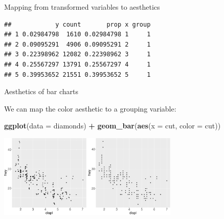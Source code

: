 \documentclass[ignorenonframetext,]{beamer}
\newenvironment{Shaded}{\begin{snugshade}}{\end{snugshade}}
\newcommand{\DataTypeTok}[1]{\textcolor[rgb]{0.13,0.29,0.53}{#1}}
\newcommand{\DecValTok}[1]{\textcolor[rgb]{0.00,0.00,0.81}{#1}}
\newcommand{\KeywordTok}[1]{\textcolor[rgb]{0.13,0.29,0.53}{\textbf{#1}}}
\newcommand{\NormalTok}[1]{#1}
\newcommand{\OperatorTok}[1]{\textcolor[rgb]{0.81,0.36,0.00}{\textbf{#1}}}
\newcommand{\StringTok}[1]{\textcolor[rgb]{0.31,0.60,0.02}{#1}}
\begin{document}
\begin{frame}[fragile]{Mapping from transformed variables to aesthetics}
\protect\hypertarget{mapping-from-transformed-variables-to-aesthetics-5}{}

\begin{Shaded}
\end{Shaded}

\begin{verbatim}
##            y count       prop x group
## 1 0.02984798  1610 0.02984798 1     1
## 2 0.09095291  4906 0.09095291 2     1
## 3 0.22398962 12082 0.22398962 3     1
## 4 0.25567297 13791 0.25567297 4     1
## 5 0.39953652 21551 0.39953652 5     1
\end{verbatim}

\end{frame}

\begin{frame}[fragile]{Aesthetics of bar charts}
\protect\hypertarget{aesthetics-of-bar-charts}{}

We can map the color aesthetic to a grouping variable:

\begin{Shaded}
\begin{Highlighting}[]
\KeywordTok{ggplot}\NormalTok{(}\DataTypeTok{data =}\NormalTok{ diamonds) }\OperatorTok{+}\StringTok{ }
\StringTok{  }\KeywordTok{geom_bar}\NormalTok{(}\KeywordTok{aes}\NormalTok{(}\DataTypeTok{x =}\NormalTok{ cut, }\DataTypeTok{color =}\NormalTok{ cut))}
\end{Highlighting}
\end{Shaded}

\begin{center}\includegraphics[height=150px]{data-visualization_files/figure-beamer/unnamed-chunk-132-1} \end{center}

\end{frame}
\end{document}
